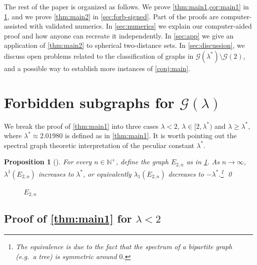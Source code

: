 \documentclass[11pt]{article}
\newtheorem{proposition}[theorem]{Proposition}
\theoremstyle{definition}
\theoremstyle{remark}
\newcommand{\la}{\lambda}
\newcommand{\G}{\mathcal{G}}
\newcommand{\N}{\mathbb{N}}
\newcommand{\Gl}{\G(\la)}
\begin{document}
The rest of the paper is organized as follows. We prove \cref{thm:main1,cor:main1} in \cref{sec:forb}, and we prove \cref{thm:main2} in \cref{sec:forb-signed}. Part of the proofs are computer-assisted with validated numerics. In \cref{sec:numerics} we explain our computer-aided proof and how anyone can recreate it independently. In \cref{sec:app} we give an application of \cref{thm:main2} to spherical two-distance sets. In \cref{sec:discussion}, we discuss open problems related to the classification of graphs in $\G(\la^*) \setminus \G(2)$, and a possible way to establish more instances of \cref{conj:main}.

\section{Forbidden subgraphs for \texorpdfstring{$\Gl$}{graphs with eigenvalues bounded from below}} \label{sec:forb}

We break the proof of \cref{thm:main1} into three cases $\la < 2$, $\la \in [2, \la^*)$ and $\la \ge \la^*$, where $\la^* \approx 2.01980$ is defined as in \cref{thm:main1}. It is worth pointing out the spectral graph theoretic interpretation of the peculiar constant $\la^*$.

\begin{proposition}[{\cite[Lemma~5(e)]{JP20}}] \label{lem:e2n}
    For every $n \in \N^+$, define the graph $E_{2,n}$ as in \cref{fig:e2n}. As $n \to \infty$, $\la^1(E_{2,n})$ increases to $\la^*$, or equivalently $\la_1(E_{2,n})$ decreases to $-\la^*$.\footnote{The equivalence is due to the fact that the spectrum of a bipartite graph (e.g.\ a tree) is symmetric around $0$.} \qed
\end{proposition}

\begin{figure}
    \centering
    \caption{$E_{2,n}$} \label{fig:e2n}
\end{figure}

\subsection{Proof of \texorpdfstring{\cref{thm:main1}}{the first main theorem} for \texorpdfstring{$\la < 2$}{λ < 2}} \label{subsec:less-than-2}
\end{document}
